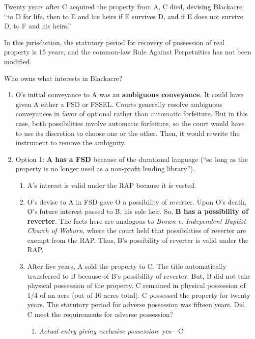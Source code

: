 Twenty years after C acquired the property from A, C died, devising Blackacre 
``to D for life, then to E and his heirs if E survives D, and if E does not 
survive D, to F and his heirs.''

In this jurisdiction, the statutory period for recovery of possession of real 
property is 15 years, and the common-law Rule Against Perpetuities has not 
been modified.

Who owns what interests in Blackacre?

\begin{enumerate}
    \item O's initial conveyance to A was an \textbf{ambiguous conveyance}. It 
    could have given A either a FSD or FSSEL. Courts generally resolve 
    ambiguous conveyances in favor of optional rather than automatic 
    forfeiture. But in this case, both possibilities involve automatic 
    forfeiture, so the court would have to use its discretion to choose one or 
    the other. Then, it would rewrite the instrument to remove the ambiguity.
    \item Option 1: \textbf{A has a FSD} because of the durational language 
    (``so long as the property is no longer used as a non-profit lending 
    library'').
    \begin{enumerate}
        \item A's interest is valid under the RAP because it is vested.
        \item O's devise to A in FSD gave O a possibility of reverter. Upon 
        O's death, O's future interest passed to B, his sole heir. So, 
        \textbf{B has a possibility of reverter}. The facts here are analogous 
        to \emph{Brown v. Independent Baptist Church of Woburn}, where the 
        court held that possibilities of reverter are exempt from the RAP. 
        Thus, B's possibility of reverter is valid under the RAP.
        \item After five years, A sold the property to C. The title 
        automatically transferred to B because of B's possibility of reverter. 
        But, B did not take physical possession of the property. C remained in 
        physical possession of 1/4 of an acre (out of 10 acres total). C 
        possessed the property for twenty years. The statutory period for 
        adverse possession was fifteen years. Did C meet the requirements for 
        adverse possession?
        \begin{enumerate}
            \item \emph{Actual entry giving exclusive possession}: yes---C 

\end{enumerate}
\end{enumerate}
\end{enumerate}
